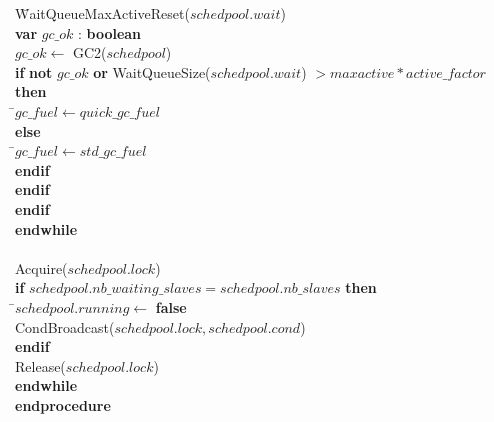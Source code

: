 \documentclass[a4paper,11pt]{article}
\newenvironment{program}{
  \begin{sffamily}
  \begin{scriptsize}
  \begin{tabbing}}
 {\end{tabbing}
  \end{scriptsize}
  \end{sffamily}}
\newcommand{\kw}[1]{\textsf{\textbf{#1}}}
\newcommand{\pindent}{\hspace{2em}\=}
\newcommand{\synchro}[1]{\textcolor{synchrocolor}{#1}}
\begin{document}
\begin{program}
  \>\>\>\>\pindent WaitQueueMaxActiveReset($schedpool.wait$) \\
  \>\>\>\>\>\kw{var} $gc\_ok$ : \kw{boolean} \\
  \>\>\>\>\>$gc\_ok \leftarrow$ GC2($schedpool$) \\
  \>\>\>\>\>\kw{if} \kw{not} $gc\_ok$ \kw{or} WaitQueueSize($schedpool.wait$) $> maxactive * active\_factor$ \kw{then} \\
  \>\>\>\>\>\pindent$gc\_fuel \leftarrow quick\_gc\_fuel$ \\
  \>\>\>\>\>\kw{else} \\
  \>\>\>\>\>\pindent$gc\_fuel \leftarrow std\_gc\_fuel$ \\
  \>\>\>\>\>\kw{endif} \\
  \>\>\>\>\kw{endif} \\
  \>\>\>\kw{endif} \\
  \>\>\kw{endwhile} \\
  \>\> \\
  \>\>\synchro{Acquire($schedpool.lock$)} \\
  \>\>\kw{if} $schedpool.nb\_waiting\_slaves = schedpool.nb\_slaves$ \kw{then} \\
  \>\>\pindent $schedpool.running \leftarrow$ \kw{false} \\
  \>\>\synchro{CondBroadcast($schedpool.lock, schedpool.cond$)} \\
  \>\>\kw{endif} \\
  \>\>\synchro{Release($schedpool.lock$)} \\
  \>\kw{endwhile} \\
  \kw{endprocedure}
\end{program}

\newpage
\end{document}
